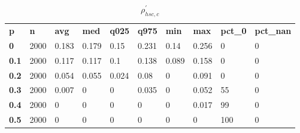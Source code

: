 \begin{table}[h]
 \centering 
\footnotesize
\caption{$\rho_{hsc,c}^\prime $}
\label{tab:alphahscc}
\begin{tabular}[h]{| l l l l l l l l l l|
    } \hline
\textbf{ p} & \textbf{ n} & \textbf{ avg} & \textbf{ med} & \textbf{ q025} & \textbf{ q975} & \textbf{ min} & \textbf{ max} & \textbf{ pct\_0} & \textbf{ pct\_nan}
           \\
  \textbf{  0} & 2000 & 0.183 & 0.179 &  0.15 & 0.231 &  0.14 & 0.256 &   0 & 0
           \\
  \textbf{0.1} & 2000 & 0.117 & 0.117 &   0.1 & 0.138 & 0.089 & 0.158 &   0 & 0
           \\
  \textbf{0.2} & 2000 & 0.054 & 0.055 & 0.024 &  0.08 &     0 & 0.091 &   0 & 0
           \\
  \textbf{0.3} & 2000 & 0.007 &     0 &     0 & 0.035 &     0 & 0.052 &  55 & 0
           \\
  \textbf{0.4} & 2000 &     0 &     0 &     0 &     0 &     0 & 0.017 &  99 & 0
           \\
  \textbf{0.5} & 2000 &     0 &     0 &     0 &     0 &     0 &     0 & 100 & 0
           \\
 \hline \end{tabular}
 \end{table}
